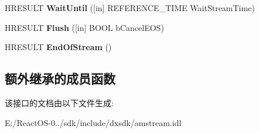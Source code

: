 \begin{DoxyCompactItemize}
H\+R\+E\+S\+U\+LT {\bfseries Wait\+Until} (\mbox{[}in\mbox{]} R\+E\+F\+E\+R\+E\+N\+C\+E\+\_\+\+T\+I\+ME Wait\+Stream\+Time)
\item 
\mbox{\label{interface_i_media_stream_filter_ab5eb6141e508321f3e4fd4e27bfcef4c}} 
H\+R\+E\+S\+U\+LT {\bfseries Flush} (\mbox{[}in\mbox{]} B\+O\+OL b\+Cancel\+E\+OS)
\item 
\mbox{\label{interface_i_media_stream_filter_afba30cbb530ff45c054501b9c4f11053}} 
H\+R\+E\+S\+U\+LT {\bfseries End\+Of\+Stream} ()
\end{DoxyCompactItemize}
\subsection*{额外继承的成员函数}


该接口的文档由以下文件生成\+:\begin{DoxyCompactItemize}
\item 
E\+:/\+React\+O\+S-\/0../sdk/include/dxsdk/amstream.\+idl\end{DoxyCompactItemize}
